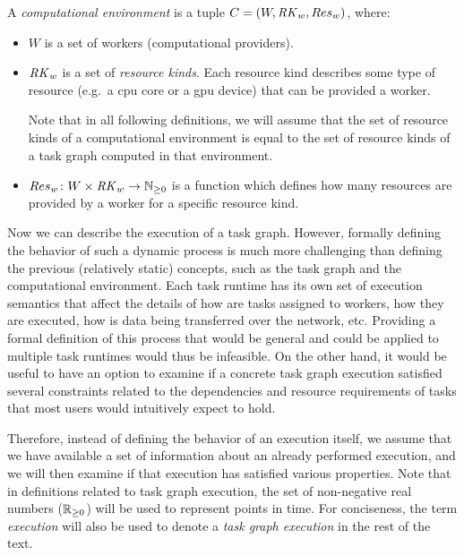 \vspace{2mm} A \emph{computational environment}
is a tuple $C = (W, \mathit{RK}_w, Res_w)$, where:
\begin{itemize}[itemsep=0pt]
	\item $W$ is a set of workers (computational providers).
	\item $\mathit{RK}_w$ is a set of \emph{resource kinds}. Each resource kind
	      describes some type of resource (e.g.\ a \gls{cpu} core or a \gls{gpu} device) that
		  can be provided a worker.

	      Note that in all following definitions, we will assume that the set of resource kinds
		  of a computational environment is equal to the set of resource kinds of a task graph
		  computed in that environment.
	\item $Res_w\colon W \times \mathit{RK}_w \rightarrow
	\mathbb{N}_{\geq{}0}$ is a function which defines how many resources are
	      provided by a worker for a specific resource kind.
\end{itemize}

Now we can describe the execution of a task graph. However, formally defining the behavior of
such a dynamic process is much more challenging than defining
the previous (relatively static) concepts, such as the task graph and the computational
environment. Each task runtime has its own set of execution semantics that affect the details of how are tasks assigned to
workers, how they are executed, how is data being transferred over the network, etc. Providing a formal
definition of this process that would be general and could be applied to multiple task runtimes
would thus be infeasible. On the other hand, it would be useful to have an option to examine if a
concrete task graph execution satisfied several constraints related to the dependencies and
resource requirements of tasks that most users would intuitively expect to hold.

Therefore, instead of defining the behavior of an execution itself, we assume that we have
available a set of information about an already performed execution, and we
will then examine if that execution has satisfied various properties. Note that in definitions
related to task graph execution, the set of non-negative real numbers ($\mathbb{R}_{\geq{}0}$) will
be used to represent points in time. For conciseness, the term \emph{execution} will also be used to denote a
\emph{task graph execution} in the rest of the text.

